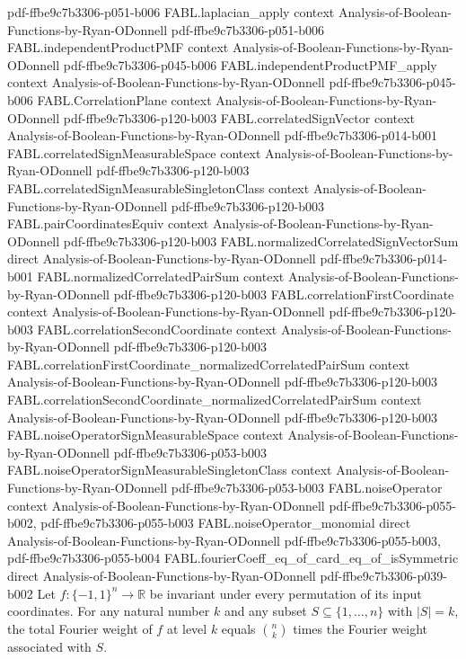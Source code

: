 \begin{theorem}
  {pdf-ffbe9c7b3306-p051-b006}
\proofstep
  {FABL.laplacian_apply}
  {context}
  {Analysis-of-Boolean-Functions-by-Ryan-ODonnell}
  {pdf-ffbe9c7b3306-p051-b006}
\proofstep
  {FABL.independentProductPMF}
  {context}
  {Analysis-of-Boolean-Functions-by-Ryan-ODonnell}
  {pdf-ffbe9c7b3306-p045-b006}
\proofstep
  {FABL.independentProductPMF_apply}
  {context}
  {Analysis-of-Boolean-Functions-by-Ryan-ODonnell}
  {pdf-ffbe9c7b3306-p045-b006}
\proofstep
  {FABL.CorrelationPlane}
  {context}
  {Analysis-of-Boolean-Functions-by-Ryan-ODonnell}
  {pdf-ffbe9c7b3306-p120-b003}
\proofstep
  {FABL.correlatedSignVector}
  {context}
  {Analysis-of-Boolean-Functions-by-Ryan-ODonnell}
  {pdf-ffbe9c7b3306-p014-b001}
\proofstep
  {FABL.correlatedSignMeasurableSpace}
  {context}
  {Analysis-of-Boolean-Functions-by-Ryan-ODonnell}
  {pdf-ffbe9c7b3306-p120-b003}
\proofstep
  {FABL.correlatedSignMeasurableSingletonClass}
  {context}
  {Analysis-of-Boolean-Functions-by-Ryan-ODonnell}
  {pdf-ffbe9c7b3306-p120-b003}
\proofstep
  {FABL.pairCoordinatesEquiv}
  {context}
  {Analysis-of-Boolean-Functions-by-Ryan-ODonnell}
  {pdf-ffbe9c7b3306-p120-b003}
\proofstep
  {FABL.normalizedCorrelatedSignVectorSum}
  {direct}
  {Analysis-of-Boolean-Functions-by-Ryan-ODonnell}
  {pdf-ffbe9c7b3306-p014-b001}
\proofstep
  {FABL.normalizedCorrelatedPairSum}
  {context}
  {Analysis-of-Boolean-Functions-by-Ryan-ODonnell}
  {pdf-ffbe9c7b3306-p120-b003}
\proofstep
  {FABL.correlationFirstCoordinate}
  {context}
  {Analysis-of-Boolean-Functions-by-Ryan-ODonnell}
  {pdf-ffbe9c7b3306-p120-b003}
\proofstep
  {FABL.correlationSecondCoordinate}
  {context}
  {Analysis-of-Boolean-Functions-by-Ryan-ODonnell}
  {pdf-ffbe9c7b3306-p120-b003}
\proofstep
  {FABL.correlationFirstCoordinate_normalizedCorrelatedPairSum}
  {context}
  {Analysis-of-Boolean-Functions-by-Ryan-ODonnell}
  {pdf-ffbe9c7b3306-p120-b003}
\proofstep
  {FABL.correlationSecondCoordinate_normalizedCorrelatedPairSum}
  {context}
  {Analysis-of-Boolean-Functions-by-Ryan-ODonnell}
  {pdf-ffbe9c7b3306-p120-b003}
\proofstep
  {FABL.noiseOperatorSignMeasurableSpace}
  {context}
  {Analysis-of-Boolean-Functions-by-Ryan-ODonnell}
  {pdf-ffbe9c7b3306-p053-b003}
\proofstep
  {FABL.noiseOperatorSignMeasurableSingletonClass}
  {context}
  {Analysis-of-Boolean-Functions-by-Ryan-ODonnell}
  {pdf-ffbe9c7b3306-p053-b003}
\proofstep
  {FABL.noiseOperator}
  {context}
  {Analysis-of-Boolean-Functions-by-Ryan-ODonnell}
  {pdf-ffbe9c7b3306-p055-b002,
    pdf-ffbe9c7b3306-p055-b003}
\proofstep
  {FABL.noiseOperator_monomial}
  {direct}
  {Analysis-of-Boolean-Functions-by-Ryan-ODonnell}
  {pdf-ffbe9c7b3306-p055-b003,
    pdf-ffbe9c7b3306-p055-b004}
\proofstep
  {FABL.fourierCoeff_eq_of_card_eq_of_isSymmetric}
  {direct}
  {Analysis-of-Boolean-Functions-by-Ryan-ODonnell}
  {pdf-ffbe9c7b3306-p039-b002}
Let $f:\{-1,1\}^n\to\mathbb R$ be invariant under every permutation of its input
coordinates. For any natural number $k$ and any subset $S\subseteq\{1,\ldots,n\}$ with
$|S|=k$, the total Fourier weight of $f$ at level $k$ equals $\binom{n}{k}$ times the
Fourier weight associated with $S$.
\end{theorem}


